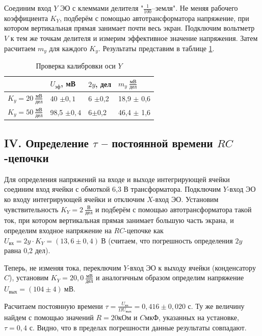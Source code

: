 \documentclass[a4paper,10pt]{article}
\begin{document}
Соединим вход $Y$ ЭО с клеммами делителя "$\frac{1}{100}$--земля". Не меняя рабочего коэффициента $K_Y$, подберём с помощью автотрансформатора напряжение, при котором вертикальная прямая занимает почти весь экран. Подключим вольтметр $V$ к тем же точкам делителя и измерим эффективное значение напряжения. Затем расчитаем $m_y$ для каждого $K_y$. Результаты представим в таблице  \ref{data3}.

\begin{table}[h!]
	\centering
	\caption{Проверка калибровки оси $Y$} \label{data3}
	\begin{tabular}{|l|l|l|l|}
		\hline
		& $U_{\text{эф}}$, мВ & $2y$, дел & $m_y~\frac{\text{мВ}}{\text{дел}}$ \\ \hline
		$K_y = 20~\frac{\text{мВ}}{\text{дел}}$  & 40 $\pm 0,1$ & 6 $\pm$0,2 & 18,9 $\pm$ 0,6 \\ \hline
		$K_y = 50~\frac{\text{мВ}}{\text{дел}}$  & 98,5 $\pm 0,4$  & 6$\pm$0,2 & 46,4 $\pm$ 1,6 \\ \hline
	\end{tabular}
\end{table}

\subsection*{IV. Определение $\tau$ -- постоянной времени $RC$-цепочки}

Для определения напряжений на входе и выходе интегрирующей ячейки соединим вход ячейки с обмоткой 6,3 В трансформатора. Подключим $Y$-вход ЭО ко входу интегрирующей ячейки и отключим $X$-вход ЭО. Установим чувствительность $K_Y=2~\frac{\text{В}}{\text{дел}}$ и подберём с помощью автотрансформатора такой ток, при котором вертикальная прямая занимает большую часть экрана, и определим входное напряжение на $RC$-цепочке как $U_{\text{вх}}=2y\cdot K_Y=\left(13,6\pm0,4\right)~\text{В}$ (считаем, что погрешность определения $2y$ равна 0,2 дел).

Теперь, не изменяя тока, переключим $Y$-вход ЭО к выходу ячейки (конденсатору $C$), установим $K_Y=20,0~\frac{\text{мВ}}{\text{дел}}$ и аналогичным образом определим напряжение $U_{\text{вых}}=\left(104\pm4\right)~\text{мВ}$.

Расчитаем постоянную времени $\tau = \frac{U_{\text{вх}}}{\Omega U_{\text{вых}}} = 0,416 \pm 0,020$ с. Ту же величину найдем с помощью значений $R = 20$кОм и $C$мкФ, указанных на установке, $\tau = 0,4$ с. Видно, что в пределах погрешности данные результаты совпадают.
\end{document}

